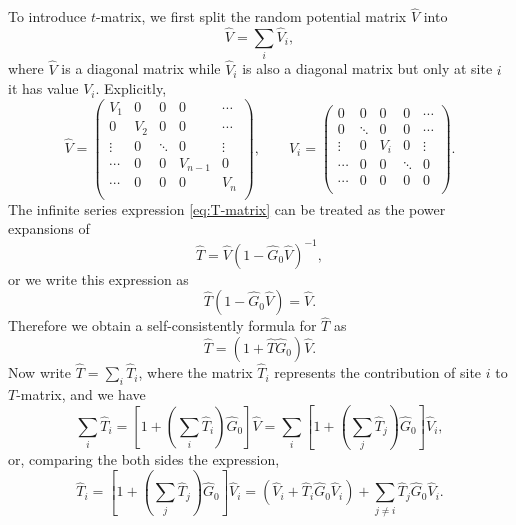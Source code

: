 \documentclass{book}
\numberwithin{equation}{section}
\begin{document}
To introduce $t$-matrix, we first split the random potential matrix
$\hat{V}$ into
\begin{equation}
  \hat{V}=\sum_i\hat{V}_i,
\end{equation}
where $\hat{V}$ is a diagonal matrix while $\hat{V}_i$ is also a
diagonal matrix but only at site $i$ it has value $V_i$. Explicitly,
\begin{equation}
  \hat{V}=\begin{pmatrix}
    V_1&0&0&0&\cdots\\
    0&V_2&0&0&\cdots\\
    \vdots&0&\ddots&0&\vdots\\
    \cdots&0&0&V_{n-1}&0\\
    \cdots&0&0&0&V_{n}\\
  \end{pmatrix},\qquad
  \hat{V}_i=\begin{pmatrix}
    0&0&0&0&\cdots\\
    0&\ddots&0&0&\cdots\\
    \vdots&0&V_i&0&\vdots\\
    \cdots&0&0&\ddots&0\\
    \cdots&0&0&0&0\\
  \end{pmatrix}.
\end{equation}
The infinite series expression \eqref{eq:T-matrix} can be treated as
the power expansions of
\begin{equation}
  \hat{T}=\hat{V}(1-\hat{G}_0\hat{V})^{-1},
\end{equation}
or we write this expression as
\begin{equation}
  \hat{T}(1-\hat{G}_0\hat{V})=\hat{V}.
\end{equation}
Therefore we obtain a self-consistently formula for $\hat{T}$ as
\begin{equation}
  \hat{T}=(1+\hat{T}\hat{G}_0)\hat{V}.
\end{equation}
Now write $\hat{T}=\sum_{i}\hat{T}_i$, where the matrix $\hat{T}_i$
represents the contribution of site $i$ to $T$-matrix, and we have
\begin{equation}
  \sum_{i}\hat{T}_i=[1+(\sum_{i}\hat{T}_i)\hat{G}_0]\hat{V}=
  \sum_{i}[1+(\sum_{j}\hat{T}_j)\hat{G}_0]\hat{V}_i,
\end{equation}
or, comparing the both sides the expression,
\begin{equation}
  \label{eq:T-matrix-i}
  \hat{T}_i=[1+(\sum_j\hat{T}_j)\hat{G}_0]\hat{V}_i=
  (\hat{V}_i+\hat{T}_i\hat{G}_0\hat{V}_i)+\sum_{j\ne i}\hat{T}_j\hat{G}_0\hat{V}_i.
\end{equation}
\end{document}
